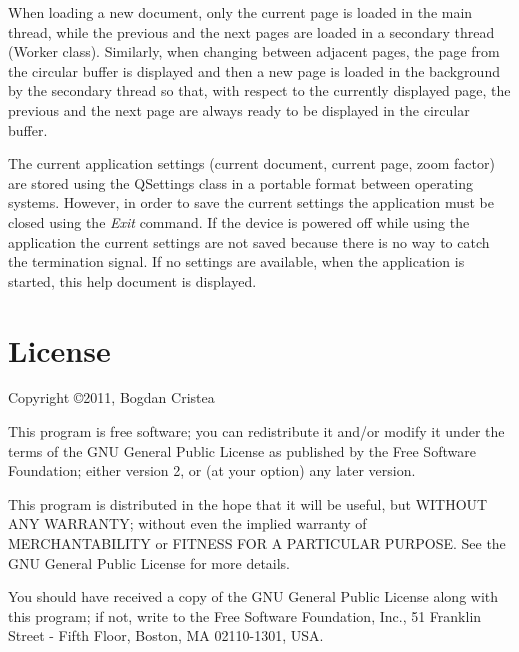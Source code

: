 \documentclass[journal,12pt]{IEEEtran}
\begin{document}
When loading a new document, only the current page is loaded in the main thread, while the previous and the next pages are loaded in a secondary thread (\textrm{Worker} class). Similarly, when changing between adjacent pages, the page from the circular buffer is displayed and then a new page is loaded in the background by the secondary thread so that, with respect to the currently displayed page, the previous and the next page are always ready to be displayed in the circular buffer.

The current application settings (current document, current page, zoom factor) are stored using the \textrm{QSettings} class in a portable format between operating systems. However, in order to save the current settings the application must be closed using the \textit{Exit} command. If the device is powered off while using the application the current settings are not saved because there is no way to catch the termination signal. If no settings are available, when the application is started, this help document is displayed.

\section{License}
 Copyright \copyright 2011, Bogdan Cristea
 
 This program is free software; you can redistribute it and/or modify  it under the terms of the GNU General Public License as published by  the Free Software Foundation; either version 2, or (at your option)  any later version.
 
 This program is distributed in the hope that it will be useful,  but WITHOUT ANY WARRANTY; without even the implied warranty of
 MERCHANTABILITY or FITNESS FOR A PARTICULAR PURPOSE.  See the  GNU General Public License for more details.
 
 You should have received a copy of the GNU General Public License along with this program; if not, write to the Free Software
 Foundation, Inc., 51 Franklin Street - Fifth Floor, Boston, MA 02110-1301, USA.
\end{document}
